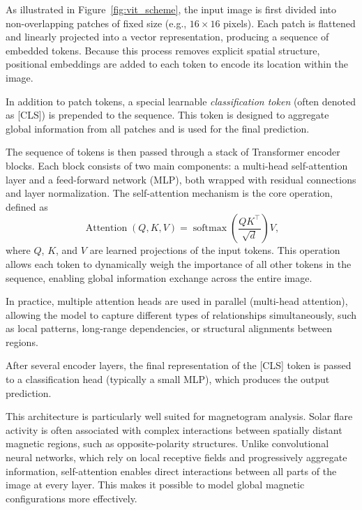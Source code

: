 As illustrated in Figure~\ref{fig:vit_scheme}, the input image is first divided into non-overlapping patches of fixed size (e.g., $16 \times 16$ pixels). Each patch is flattened and linearly projected into a vector representation, producing a sequence of embedded tokens. Because this process removes explicit spatial structure, positional embeddings are added to each token to encode its location within the image.

In addition to patch tokens, a special learnable \emph{classification token} (often denoted as [CLS]) is prepended to the sequence. This token is designed to aggregate global information from all patches and is used for the final prediction.

The sequence of tokens is then passed through a stack of Transformer encoder blocks. Each block consists of two main components: a multi-head self-attention layer and a feed-forward network (MLP), both wrapped with residual connections and layer normalization. The self-attention mechanism is the core operation, defined as
\begin{equation}
\operatorname{Attention}(Q,K,V)
= \operatorname{softmax}\left(\frac{QK^\top}{\sqrt{d}}\right)V,
\end{equation}
where $Q$, $K$, and $V$ are learned projections of the input tokens. This operation allows each token to dynamically weigh the importance of all other tokens in the sequence, enabling global information exchange across the entire image.

In practice, multiple attention heads are used in parallel (multi-head attention), allowing the model to capture different types of relationships simultaneously, such as local patterns, long-range dependencies, or structural alignments between regions.

After several encoder layers, the final representation of the [CLS] token is passed to a classification head (typically a small MLP), which produces the output prediction.

This architecture is particularly well suited for magnetogram analysis. Solar flare activity is often associated with complex interactions between spatially distant magnetic regions, such as opposite-polarity structures. Unlike convolutional neural networks, which rely on local receptive fields and progressively aggregate information, self-attention enables direct interactions between all parts of the image at every layer. This makes it possible to model global magnetic configurations more effectively.


